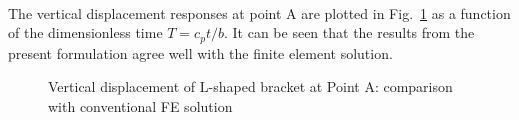 \paragraph{}
The vertical displacement responses at point A are plotted in Fig.~\ref{iso_fig:l_uy_dynamic_at_A} as a function of the dimensionless
    time $T = c_pt/b$.
It can be seen that the results from the present formulation agree well with the finite element solution.
    \begin{figure}
        \centering
    \caption{Vertical displacement of L-shaped bracket at Point A: comparison with conventional FE solution}
    \label{iso_fig:l_uy_dynamic_at_A}
    \end{figure}
%
\pagebreak